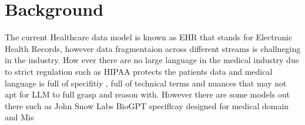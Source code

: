 \documentclass{article}
\begin{document}
\section{Background}

The current Healthcare data model is known as EHR that stands for Electronic Health Records, however data fragmentaion across different streams is challneging in the industry. How ever there are no large language in the medical industry due to strict regulation such as HIPAA protects the patients data and medical language is full of specifitiy , full of technical terms and nuances that may not apt for LLM to full grasp and reason with. However there are some models out there such as John Snow Labs BioGPT speciflcay designed for medical domain and Mis




\end{document}
